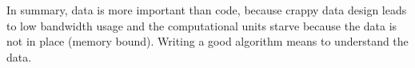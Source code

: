 In summary, data is more important than code, because crappy data design leads
to low bandwidth usage and the computational units starve because the data
is not in place (memory bound). Writing a good algorithm means to understand the 
data. 








